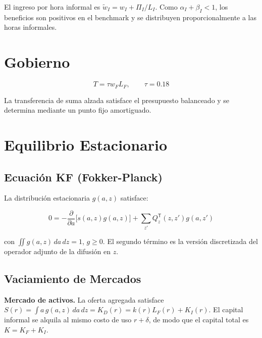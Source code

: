 \documentclass[12pt]{article}
\newcommand{\pder}[2]{\frac{\partial #1}{\partial #2}}
\begin{document}
El ingreso por hora informal es $\tilde{w}_I = w_I + \Pi_I/L_I$. Como $\alpha_I+\beta_I<1$, los beneficios son positivos en el benchmark y se distribuyen proporcionalmente a las horas informales.

\section{Gobierno}

\begin{equation}\label{eq:gov}
T = \tau w_F L_F, \qquad \tau = 0.18
\end{equation}

La transferencia de suma alzada satisface el presupuesto balanceado y se determina mediante un punto fijo amortiguado.

\section{Equilibrio Estacionario}

\subsection{Ecuación KF (Fokker-Planck)}

La distribución estacionaria $g(a,z)$ satisface:

\begin{equation}\label{eq:KF}
0 = -\pder{}{a}\big[s(a,z) g(a,z)\big] + \sum_{z'} Q_z^{\mathsf{T}}(z,z') g(a,z')
\end{equation}

con $\iint g(a,z) \,da\,dz = 1$, $g \ge 0$. El segundo término es la versión discretizada del operador adjunto de la difusión en $z$.

\subsection{Vaciamiento de Mercados}\label{sec:mercados}

\textbf{Mercado de activos.} La oferta agregada satisface $S(r)=\int a\,g(a,z)\,da\,dz=K_D(r)=k(r)L_F(r)+K_I(r)$. El capital informal se alquila al mismo costo de uso $r+\delta$, de modo que el capital total es $K=K_F+K_I$.
\end{document}
